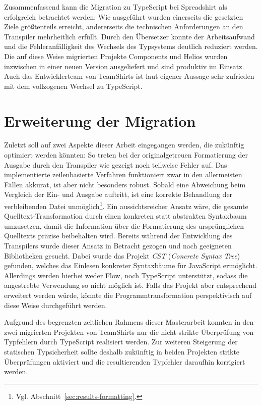 Zusammenfassend kann die Migration zu TypeScript bei Spreadshirt als erfolgreich betrachtet werden: Wie ausgeführt wurden einerseits die gesetzten Ziele größtenteils erreicht, andererseits die technischen Anforderungen an den Transpiler mehrheitlich erfüllt. Durch den Übersetzer konnte der Arbeitsaufwand und die Fehleranfälligkeit des Wechsels des Typsystems deutlich reduziert werden. Die auf diese Weise migrierten Projekte Components und Helios wurden inzwischen in einer neuen Version ausgeliefert und sind produktiv im Einsatz. Auch das Entwicklerteam von TeamShirts ist laut eigener Aussage sehr zufrieden mit dem vollzogenen Wechsel zu TypeScript.

\section{Erweiterung der Migration}

Zuletzt soll auf zwei Aspekte dieser Arbeit eingegangen werden, die zukünftig optimiert werden könnten: So treten bei der originalgetreuen Formatierung der Ausgabe durch den Transpiler wie gezeigt noch teilweise Fehler auf. Das implementierte zeilenbasierte Verfahren funktioniert zwar in den allermeisten Fällen akkurat, ist aber nicht besonders robust. Sobald eine Abweichung beim Vergleich der Ein- und Ausgabe auftritt, ist eine korrekte Behandlung der verbleibenden Datei unmöglich\footnote{Vgl. Abschnitt~\ref{sec:results-formatting}.}. Ein aussichtsreicher Ansatz wäre, die gesamte Quelltext-Transformation durch einen konkreten statt abstrakten Syntaxbaum umzusetzen, damit die Information über die Formatierung des ursprünglichen Quelltexts präzise beibehalten wird. Bereits während der Entwicklung des Transpilers wurde dieser Ansatz in Betracht gezogen und nach geeigneten Bibliotheken gesucht. Dabei wurde das Projekt \textit{CST} (\textit{Concrete Syntax Tree})~\autocite{SOFTWARE:CST} gefunden, welches das Einlesen konkreter Syntaxbäume für JavaScript ermöglicht. Allerdings werden hierbei weder Flow, noch TypeScript unterstützt, sodass die angestrebte Verwendung so nicht möglich ist. Falls das Projekt aber entsprechend erweitert werden würde, könnte die Programmtransformation perspektivisch auf diese Weise durchgeführt werden.

Aufgrund des begrenzten zeitlichen Rahmens dieser Masterarbeit konnten in den zwei migrierten Projekten von TeamShirts nur die nicht-strikte Überprüfung von Typfehlern durch TypeScript realisiert werden. Zur weiteren Steigerung der statischen Typsicherheit sollte deshalb zukünftig in beiden Projekten strikte Überprüfungen aktiviert und die resultierenden Typfehler daraufhin korrigiert werden.

